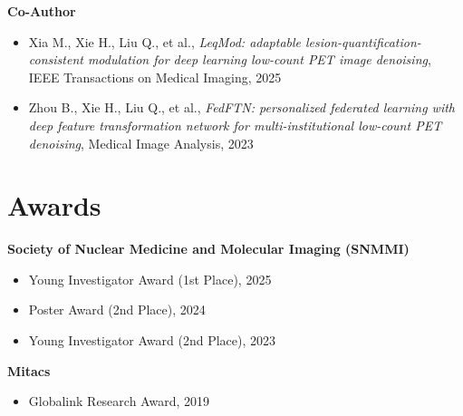\textbf{Co-Author}
\begin{itemize}[leftmargin=*]
\item Xia M., Xie H., Liu Q., et al., \textit{LeqMod: adaptable lesion-quantification-consistent modulation for deep learning low-count PET image denoising}, IEEE Transactions on Medical Imaging, 2025
\item Zhou B., Xie H., Liu Q., et al., \textit{FedFTN: personalized federated learning with deep feature transformation network for multi-institutional low-count PET denoising}, Medical Image Analysis, 2023
\end{itemize}

\section{Awards}
\textbf{Society of Nuclear Medicine and Molecular Imaging (SNMMI)}
\begin{itemize}[leftmargin=*]
\item Young Investigator Award (1st Place), 2025
\item Poster Award (2nd Place), 2024
\item Young Investigator Award (2nd Place), 2023
\end{itemize}

\textbf{Mitacs}
\begin{itemize}[leftmargin=*]
\item Globalink Research Award, 2019
\end{itemize}